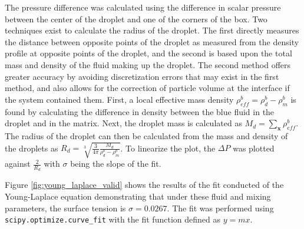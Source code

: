 The pressure difference was calculated using the difference in scalar pressure between the center of the droplet and 
one of the corners of the box. Two techniques exist to calculate the radius of the droplet. The first directly measures 
the distance between opposite points of the droplet as measured from the density profile at opposite points of the droplet, 
and the second is based upon the total mass and density of the fluid making up the droplet. The second method offers greater 
accuracy by avoiding discretization errors that may exist in the first method, and also allows for the correction of 
particle volume at the interface if the system contained them. First, a local effective mass density 
$\rho^b_{eff} = \rho^{b}_{d} - \rho^{b}_{m}$ is found by calculating the difference in density between the blue 
fluid in the droplet and in the matrix. Next, the droplet mass is calculated as $M_d = \sum_{\mathbf{x}}{\rho_{eff}^{b}}$. 
The radius of the droplet can then be calculated from the mass and density of the droplets as $R_d = \sqrt[3]{\frac{3}{4\pi} 
\frac{M_d}{\rho^b_d - \rho^b_m}}$. To linearize the plot, the $\Delta P$ was plotted against $\frac{2}{R_d}$ with 
$\sigma$ being the slope of the fit.

Figure \ref{fig:young_laplace_valid} shows the results of the fit conducted of the Young-Laplace equation demonstrating 
that under these fluid and mixing parameters, the surface tension is $\sigma = 0.0267$. The fit was performed using 
\texttt{scipy.optimize.curve\_fit} with the fit function defined as $y = mx$.